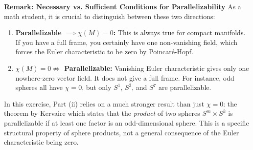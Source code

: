 \begin{solution}
\textbf{Remark: Necessary vs. Sufficient Conditions for Parallelizability}
As a math student, it is crucial to distinguish between these two directions:
\begin{enumerate}
    \item \textbf{Parallelizable $\implies \chi(M) = 0$:} This is always true for compact manifolds. If you have a full frame, you certainly have one non-vanishing field, which forces the Euler characteristic to be zero by Poincaré-Hopf.
    \item \textbf{$\chi(M) = 0 \not\Rightarrow$ Parallelizable:} Vanishing Euler characteristic gives only one nowhere-zero vector field. It does not give a full frame. For instance, odd spheres all have $\chi=0$, but only $S^1$, $S^3$, and $S^7$ are parallelizable.
\end{enumerate}
In this exercise, Part (ii) relies on a much stronger result than just $\chi=0$: the theorem by Kervaire which states that the \textit{product} of two spheres $S^m \times S^k$ is parallelizable if at least one factor is an odd-dimensional sphere. This is a specific structural property of sphere products, not a general consequence of the Euler characteristic being zero.


\end{solution}

